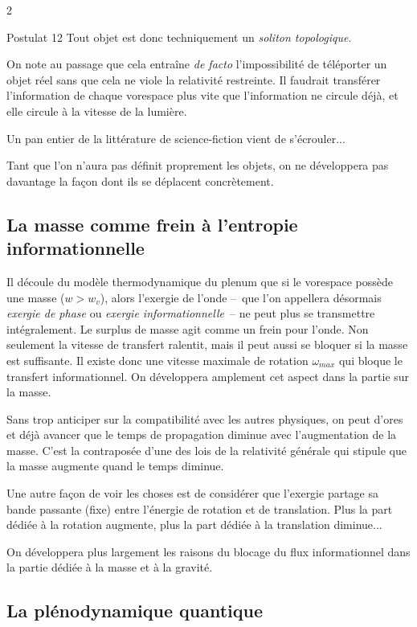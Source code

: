 \begin{multicols}{2}
\begin{mybox}[breakable,colback=blue!10, colbacktitle=pkcolor]{Postulat 12}
Tout objet est donc techniquement un \textit{soliton topologique}.
\end{mybox}
\medskip

On note au passage que cela entraîne \textit{de facto} l'impossibilité de
téléporter un objet réel sans que cela ne viole la relativité restreinte. Il
faudrait transférer l'information de chaque vorespace plus vite que
l'information ne circule déjà, et elle circule à la vitesse de la
lumière.

Un pan entier de la littérature de science-fiction vient de
s'écrouler...

Tant que l'on n'aura pas définit proprement les objets, on ne développera pas
davantage la façon dont ils se déplacent concrètement.

\subsection{La masse comme frein à l'entropie informationnelle}

Il découle du modèle thermodynamique du plenum que si le vorespace
possède une masse ($w > w_v$), alors l'exergie de l'onde --~que l'on
appellera désormais \textit{exergie de phase} ou \textit{exergie informationnelle}~-- ne
peut plus se transmettre intégralement. Le surplus de masse agit comme
un frein pour l'onde. Non seulement la vitesse de transfert ralentit,
mais il peut aussi se bloquer si la masse est suffisante. Il existe
donc une vitesse maximale de rotation $\omega_{max}$ qui bloque le transfert
informationnel. On développera amplement cet aspect dans la partie sur
la masse.

Sans trop anticiper sur la compatibilité avec les autres physiques, on
peut d'ores et déjà avancer que le temps de propagation diminue avec
l'augmentation de la masse. C'est la contraposée d'une des lois de la
relativité générale qui stipule que la masse augmente quand le temps
diminue.

Une autre façon de voir les choses est de considérer que l'exergie
partage sa bande passante (fixe) entre l'énergie de rotation et de
translation. Plus la part dédiée à la rotation augmente, plus la part
dédiée à la translation diminue...

On développera plus largement les raisons du blocage du flux
informationnel dans la partie dédiée à la masse et à la gravité.

\subsection{La plénodynamique quantique}


\end{multicols}
